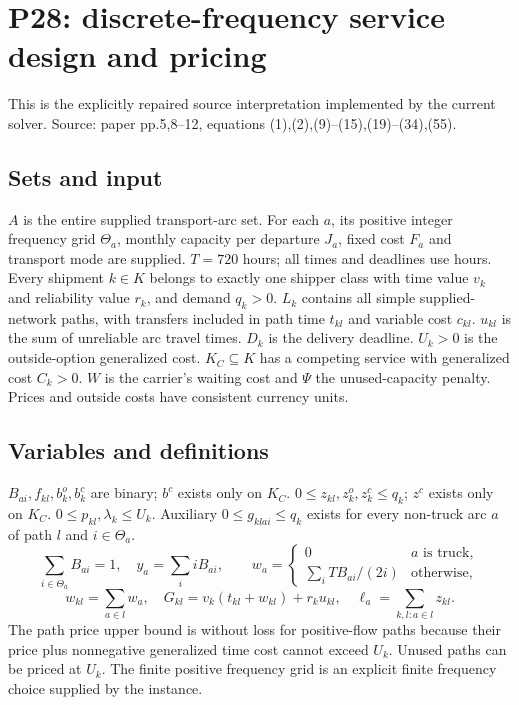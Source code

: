 \documentclass[11pt]{article}
\begin{document}
\section*{P28: discrete-frequency service design and pricing}
This is the explicitly repaired source interpretation implemented by the current
solver. 
Source: paper pp.5,8--12, equations (1),(2),(9)--(15),(19)--(34),(55).

\subsection*{Sets and input}
$A$ is the entire supplied transport-arc set. For each $a$, its positive integer
frequency grid $\Theta_a$, monthly capacity per departure $J_a$, fixed cost $F_a$
and transport mode are supplied. $T=720$ hours; all times and deadlines use hours.
Every shipment $k\in K$ belongs to exactly one shipper class with time value $v_k$
and reliability value $r_k$, and demand $q_k>0$. $L_k$ contains all simple supplied-network
paths, with transfers included in path time $t_{kl}$ and variable cost $c_{kl}$.
$u_{kl}$ is the sum of unreliable arc travel times. $D_k$ is the delivery deadline.
$U_k>0$ is the outside-option generalized cost. $K_C\subseteq K$ has a competing
service with generalized cost $C_k>0$. $W$ is the carrier's waiting cost and $\Psi$
the unused-capacity penalty. Prices and outside costs have consistent currency units.

\subsection*{Variables and definitions}
$B_{ai},f_{kl},b_k^o,b_k^c$ are binary; $b^c$ exists only on $K_C$.
$0\le z_{kl},z_k^o,z_k^c\le q_k$; $z^c$ exists only on $K_C$.
$0\le p_{kl},\lambda_k\le U_k$. Auxiliary $0\le g_{klai}\le q_k$
exists for every non-truck arc $a$ of path $l$ and $i\in\Theta_a$.
\[
 \sum_{i\in\Theta_a} B_{ai}=1,\quad
 y_a=\sum_i i B_{ai},\qquad
 w_a=\begin{cases}0& a\text{ is truck},\\
 \sum_i T B_{ai}/(2i)&\text{otherwise},\end{cases}
\]
\[
 w_{kl}=\sum_{a\in l}w_a,\quad
 G_{kl}=v_k(t_{kl}+w_{kl})+r_k u_{kl},\quad
 \ell_a=\sum_{k,l:a\in l}z_{kl}.
\]
The path price upper bound is without loss for positive-flow paths because
their price plus nonnegative generalized time cost cannot exceed $U_k$.
Unused paths can be priced at $U_k$. The finite positive frequency grid is an
explicit finite frequency choice supplied by the instance.
\end{document}
